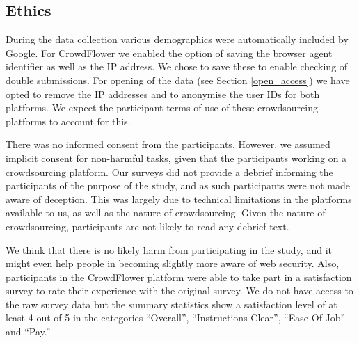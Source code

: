 \documentclass[twoside,letterpaper]{soups}
\begin{document}


\subsection{Ethics}

During the data collection various demographics were automatically included by Google. For CrowdFlower we enabled the option of saving the browser agent identifier as well as the IP address. We chose to save these to enable checking of double submissions. For opening of the data (see Section \ref{open_access}) we have opted to remove the IP addresses and to anonymise the user IDs for both platforms. We expect the participant terms of use of these crowdsourcing platforms to account for this.

There was no informed consent from the participants. However, we assumed implicit consent for non-harmful tasks, given that the participants working on a crowdsourcing platform. Our surveys did not provide a debrief informing the participants of the purpose of the study, and as such participants were not made aware of deception. This was largely due to technical limitations in the platforms available to us, as well as the nature of crowdsourcing. Given the nature of crowdsourcing, participants are not likely to read any debrief text.

We think that there is no likely harm from participating in the study, and it might even help people in becoming slightly more aware of web security. Also, participants in the CrowdFlower platform were able to take part in a satisfaction survey to rate their experience with the original survey. We do not have access to the raw survey data but the summary statistics show a satisfaction level of at least 4 out of 5 in the categories ``Overall'', ``Instructions Clear'', ``Ease Of Job'' and ``Pay.''

\end{document}
